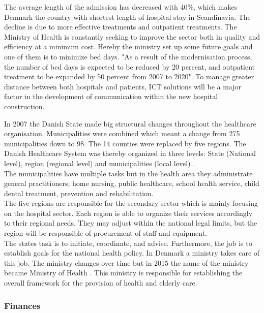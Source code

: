 The average length of the admission has decreased with 40\%, which makes Denmark the country with shortest length of hospital stay in Scandinavia. The decline is due to more effective treatments and outpatient treatments. The Ministry of Health is constantly seeking to improve the sector both in quality and efficiency at a minimum cost. Hereby the ministry set up some future goals and one of them is to minimize bed days. "As a result of the modernisation process, the number of bed days is expected to be reduced by 20 percent, and outpatient treatment to be expanded by 50 percent from 2007 to 2020". To manage greater distance between both hospitals and patients, ICT solutions will be a major factor in the development of communication within the new hospital construction\cite{DKhealthreview, Healthcareindk2}. 

In 2007 the Danish State made big structural changes throughout the healthcare organisation. Municipalities were combined which meant a change from 275 municipalities down to 98. The 14 counties were replaced by five regions. The Danish Healthcare System was thereby organized in three levels: State (National level), region (regional level) and municipalities (local level) \cite{indenrigs, Healthcareindk2}.\\

The municipalities have multiple tasks but in the health area they administrate general practitioners, home nursing, public healthcare, school health service, child dental treatment, prevention and rehabilitation\cite{sundhedsministeriet}. \\

The five regions are responsible for the secondary sector which is mainly focusing on the hospital sector. Each region is able to organize their services accordingly to their regional needs. They may adjust within the national legal limits, but the region will be responsible of procurement of staff and equipment.\\

The states task is to initiate, coordinate, and advise. Furthermore, the job is to establish goals for the national health policy\cite{sundhedsministeriet}. In Denmark a ministry takes care of this job. The ministry changes over time but in 2015 the name of the ministry became Ministry of Health \cite{ministryofhealth}. This ministry is responsible for establishing the overall framework for the provision of health and elderly care.


\subsubsection{Finances}

